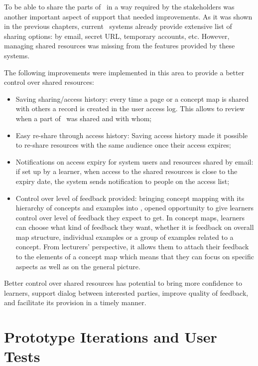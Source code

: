To be able to share the parts of \ep~in a way required by the stakeholders was
another important aspect of \LLLs support that needed improvements. As it was
shown in the previous chapters, current \ep~systems already provide extensive
list of sharing options: by email, secret URL, temporary accounts, etc. However,
managing shared resources was missing from the features provided by these
systems.

The following improvements were implemented in this area to provide a better
control over shared resources:

\begin{itemize}
  \item Saving sharing/access history: every time a page or a concept map is
  shared with others a record is created in the user access log. This allows to
  review when a part of \ep~was shared and with whom; 
  \item Easy re-share through access history: Saving access history made it
  possible to re-share resources with the same audience once their access
  expires;
  \item Notifications on access expiry for system users and resources shared by
  email: if set up by a learner, when access to the shared resources is close to
  the expiry date, the system sends notification to people on the access list;
  \item Control over level of feedback provided: bringing concept mapping with
  its hierarchy of concepts and examples into \ep, opened opportunity to give
  learners control over level of feedback they expect to get. In concept maps,
  learners can choose what kind of feedback they want, whether it is feedback on
  overall map structure, individual examples or a group of examples related to a
  concept. From lecturers' perspective, it allows them to attach their feedback
  to the elements of a concept map which means that they can focus on specific
  aspects as well as on the general picture.
\end{itemize}

Better control over shared resources has potential to bring more confidence to
learners, support dialog between interested parties, improve quality of
feedback, and facilitate its provision in a timely manner.

\section{Prototype Iterations and User Tests}
 
